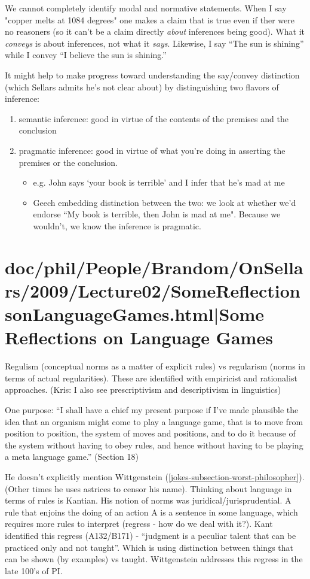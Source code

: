 \documentclass[12pt,a4paper]{report}
\begin{document}
We cannot completely identify modal and normative statements. When I say "copper melts at 1084 degrees" one makes a claim that is true even if ther were no reasoners (so it can't be a claim directly \emph{about} inferences being good). What it \emph{conveys} is about inferences, not what it \emph{says}. Likewise, I say ``The sun is shining'' while I convey ``I believe the sun is shining.''

It might help to make progress toward understanding the say/convey distinction (which Sellars admits he's not clear about) by distinguishing two flavors of inference:
\begin{enumerate}
\item semantic inference: good in virtue of the contents of the premises and the conclusion
\item pragmatic inference: good in virtue of what you're doing in asserting the premises or the conclusion.
 \begin{itemize}
 \item e.g. John says `your book is terrible' and I infer that he's mad at me
 \item Geech embedding distinction between the two: we look at whether we'd endorse ``My book is terrible, then John is mad at me". Because we wouldn't, we know the inference is pragmatic.

 \end{itemize}
\end{enumerate}
\part{doc/phil/People/Brandom/OnSellars/2009/Lecture02/SomeReflectionsonLanguageGames.html|Some Reflections on Language Games}

Regulism (conceptual norms as a matter of explicit rules) vs regularism (norms in terms of actual regularities). These are identified with empiricist and rationalist approaches. (Kris: I also see prescriptivism and descriptivism in linguistics)

One purpose: ``I shall have a chief my present purpose if I've made plausible the idea that an organism might come to play a language game, that is to move from position to position, the system of moves and positions, and to do it because of the system without having to obey rules, and hence without having to be playing a meta language game.'' (Section 18)

He doesn't explicitly mention Wittgenstein (\ref{jokes-subsection-worst-philosopher}). (Other times he uses astrices to censor his name). Thinking about language in terms of rules is Kantian. His notion of norms was juridical/jurisprudential. A rule that enjoins the doing of an action A is a sentence in some language, which requires more rules to interpret (regress - how do we deal with it?). Kant identified this regress (A132/B171) - ``judgment is a peculiar talent that can be practiced only and not taught''. Which is using distinction between things that can be shown (by examples) vs taught. Wittgenstein addresses this regress in the late 100's of PI.
\end{document}
